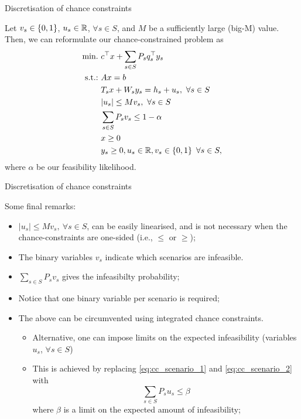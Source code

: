 \begin{frame}{Discretisation of chance constraints}

	Let $v_s \in \left\{ 0,1 \right \}$, $u_s \in \mathbb R$, $\forall s \in S$, and $M$ be a sufficiently large (big-M) value. \pause Then, we can reformulate our chance-constrained problem as
	\begin{subequations} 
		\begin{align}
			\mathop{\text{min.} \ }  & c^\top x + \sum_{s\in S} P_s q_s^\top y_s \\
			\mathop{\text{s.t.:} \ }	   & Ax = b \\
				   & T_sx + W_s y_s = h_s + u_s, \ \forall s \in S \\
				   & |u_s| \le Mv_s, \ \forall s \in S  \label{eq:cc_scenario_1}\\ 
				   & \sum_{s \in S} P_s v_s \le 1-\alpha \label{eq:cc_scenario_2} \\
				   & x \ge 0 \\
				   & y_s \ge 0, u_s \in \mathbb R, v_s \in \left\{ 0,1 \right \}  \ \forall s \in S,
		\end{align}
	\end{subequations}
	where $\alpha$ be our \alert{feasibility likelihood}. 
	
\end{frame}


\begin{frame}{Discretisation of chance constraints}

	Some final remarks:
	\vspace{-6pt}
	\begin{itemize}[<+->]
		\item $|u_s| \le Mv_s, \ \forall s \in S$, can be easily linearised, and is not necessary when the chance-constraints are one-sided (i.e., $\le$ or $\ge$);
		\item The binary variables $v_s$ indicate which scenarios are \alert{infeasible}.
		\item $\sum_{s \in S} P_s v_s$ gives the \alert{infeasibilty probability};
		\item Notice that one \alert{binary variable} per scenario is required;
		\item The above can be circumvented using \alert{integrated chance constraints}. 
		\begin{itemize}
			\item Alternative, one can impose limits on the \alert{expected infeasibility} (variables $u_s$, $\forall s \in S$)
			\item This is achieved by replacing \eqref{eq:cc_scenario_1} and \eqref{eq:cc_scenario_2} with
			   \begin{equation*}
				   \sum_{s \in S} P_s u_s \le \beta
			   \end{equation*}
			   where $\beta$ is a limit on the expected amount of infeasibility;	   
		\end{itemize}
	\end{itemize}
	
\end{frame}


